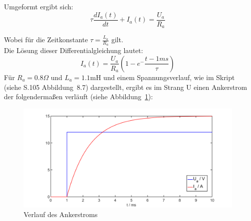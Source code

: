 Umgeformt ergibt sich:
\begin{equation}
	\tau\frac{dI_a(t)}{dt} + I_a(t) = \frac{U_a}{R_a}
\end{equation}

Wobei für die Zeitkonstante $\tau = \frac{L_a}{R_a}$ gilt.\\
Die Lösung dieser Differentialgleichung lautet:
\begin{equation}
	I_a(t) = \frac{U_a}{R_a}(1-e^-\frac{t-1ms}{\tau})
\end{equation}
Für $R_a = 0.8\Omega$ und $L_a = 1.1$mH und einem Spannungsverlauf, wie im Skript (siehe S.105 Abbildung~8.7) dargestellt, ergibt es im Strang U einen Ankerstrom der folgendermaßen verläuft (siehe Abbildung~\ref{fig:ankerstrom}):
\begin{figure}[htb]
	\includegraphics[width=\textwidth]{./Bilder/Ankerstrom_Aufgabe2d}
	\caption{Verlauf des Ankerstroms}
	\label{fig:ankerstrom}
\end{figure}




%

\clearpage
